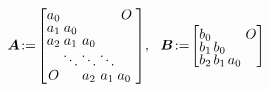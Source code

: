 \begin{align}
\!\!
\Mat{A}\!:=\!
\begin{bmatrix}
a_0&\hspace{-0.3cm} &\hspace{-0.3cm} &\hspace{-0.3cm}&\hspace{-0.3cm}O\vspace{-0.1cm}\\
a_1&\hspace{-0.3cm}a_0&\hspace{-0.3cm} &\hspace{-0.3cm} &\hspace{-0.3cm}\vspace{-0.1cm}\\
a_2&\hspace{-0.3cm}a_1&\hspace{-0.3cm}a_0&\hspace{-0.3cm}&\hspace{-0.3cm}\vspace{-0.1cm}\\
 &\hspace{-0.3cm}\ddots&\hspace{-0.3cm}\ddots&\hspace{-0.3cm}\ddots&\hspace{-0.3cm}\vspace{-0.1cm}\\
O&\hspace{-0.3cm} &\hspace{-0.3cm}a_2 &\hspace{-0.3cm}a_1 &\hspace{-0.3cm}a_0~
\end{bmatrix}
\!,~~
\Mat{B}\!:=\!
\begin{bmatrix}
b_0&\hspace{-0.3cm} &\hspace{-0.3cm} &\hspace{-0.3cm}&\hspace{-0.3cm}O\vspace{-0.1cm}\\
b_1&\hspace{-0.3cm}b_0&\hspace{-0.3cm} &\hspace{-0.3cm} &\hspace{-0.3cm}\vspace{-0.1cm}\\
b_2&\hspace{-0.3cm}b_1&\hspace{-0.3cm}a_0&\hspace{-0.3cm}&\hspace{-0.3cm}\vspace{-0.1cm}\\

\end{bmatrix}
\end{align}
